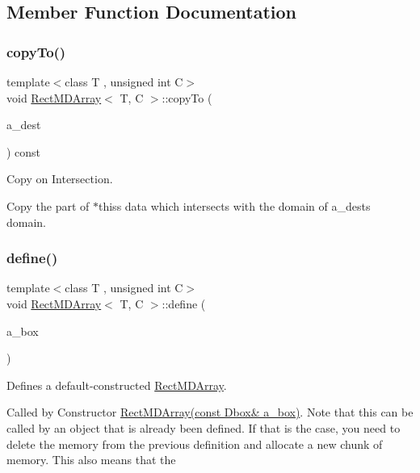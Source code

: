 \subsection{Member Function Documentation}
\mbox{\label{class_rect_m_d_array_a19daaeb911b56032a2e3fe89717d8d27}} 
\subsubsection{\texorpdfstring{copy\+To()}{copyTo()}}
{\footnotesize\ttfamily template$<$class T , unsigned int C$>$ \\
void \hyperlink{class_rect_m_d_array}{Rect\+M\+D\+Array}$<$ T, C $>$\+::copy\+To (\begin{DoxyParamCaption}\item[{\hyperlink{class_rect_m_d_array}{Rect\+M\+D\+Array}$<$ T, C $>$ \&}]{a\+\_\+dest }\end{DoxyParamCaption}) const}



Copy on Intersection. 

Copy the part of $\ast$this\textquotesingle{}s data which intersects with the domain of a\+\_\+dest\textquotesingle{}s domain. \mbox{\label{class_rect_m_d_array_a7d77761067bd63046fcb07e485d91954}} 
\subsubsection{\texorpdfstring{define()}{define()}}
{\footnotesize\ttfamily template$<$class T , unsigned int C$>$ \\
void \hyperlink{class_rect_m_d_array}{Rect\+M\+D\+Array}$<$ T, C $>$\+::define (\begin{DoxyParamCaption}\item[{const \hyperlink{class_d_box}{D\+Box} \&}]{a\+\_\+box }\end{DoxyParamCaption})}



Defines a default-\/constructed \hyperlink{class_rect_m_d_array}{Rect\+M\+D\+Array}. 

Called by Constructor \hyperlink{class_rect_m_d_array}{Rect\+M\+D\+Array(const Dbox\& a\+\_\+box)}. Note that this can be called by an object that is already been defined. If that is the case, you need to delete the memory from the previous definition and allocate a new chunk of memory. This also means that the \mbox{\label{class_rect_m_d_array_a362f76a454f2ec6455e5b7b78e51b04f}} 
